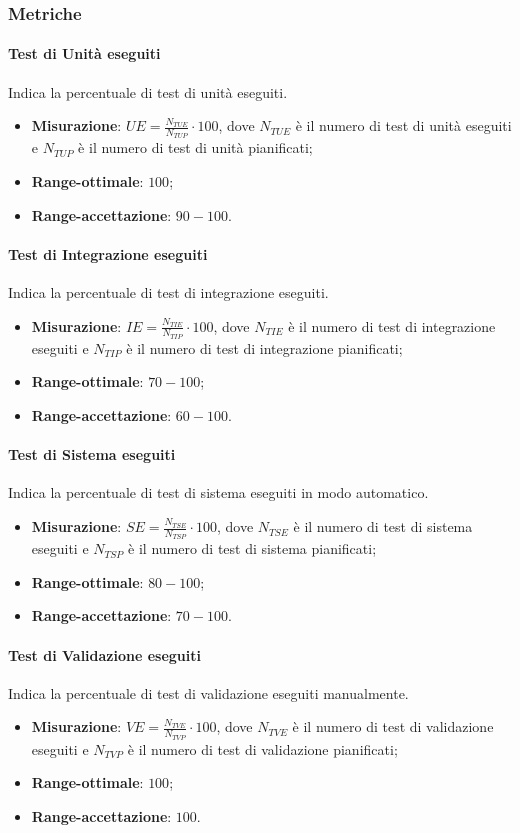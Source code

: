 \subsubsection{Metriche}
\paragraph{Test di Unità eseguiti}
\label{tuniese}
Indica la percentuale di test di unità eseguiti.
\begin{itemize}
\item \textbf{Misurazione}: $UE=\frac{N_{TUE}}{N_{TUP}} \cdot 100$, dove $N_{TUE}$ è il numero di test di unità eseguiti e $N_{TUP}$ è il numero di test di unità pianificati;
\item \textbf{Range-ottimale}: $100$;
\item \textbf{Range-accettazione}: $90 - 100$.
\end{itemize}
\paragraph{Test di Integrazione eseguiti}
\label{tintese}
Indica la percentuale di test di integrazione eseguiti.
\begin{itemize}
\item \textbf{Misurazione}: $IE=\frac{N_{TIE}}{N_{TIP}} \cdot 100$, dove $N_{TIE}$ è il numero di test di integrazione eseguiti e $N_{TIP}$ è il numero di test di integrazione pianificati;
\item \textbf{Range-ottimale}: $70 - 100$;
\item \textbf{Range-accettazione}: $60 - 100$.
\end{itemize}
\paragraph{Test di Sistema eseguiti}
\label{tsissup}
Indica la percentuale di test di sistema eseguiti in modo automatico.
\begin{itemize}
\item \textbf{Misurazione}: $SE=\frac{N_{TSE}}{N_{TSP}} \cdot 100$, dove $N_{TSE}$ è il numero di test di sistema eseguiti e $N_{TSP}$ è il numero di test di sistema pianificati;
\item \textbf{Range-ottimale}: $80 - 100$;
\item \textbf{Range-accettazione}: $70 - 100$.
\end{itemize}
\paragraph{Test di Validazione eseguiti}
\label{tvalese}
Indica la percentuale di test di validazione eseguiti manualmente.
\begin{itemize}
\item \textbf{Misurazione}: $VE=\frac{N_{TVE}}{N_{TVP}} \cdot 100$, dove $N_{TVE}$ è il numero di test di validazione eseguiti e $N_{TVP}$ è il numero di test di validazione pianificati;
\item \textbf{Range-ottimale}: $100$;
\item \textbf{Range-accettazione}: $100$.
\end{itemize}
